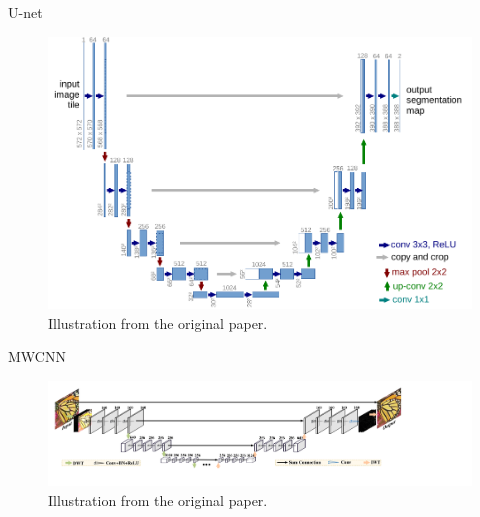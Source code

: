 \begin{frame}{U-net}
    \begin{figure}
        \centering
        \includegraphics[height=0.6\textheight]{Figures/add_slides/unet_hires.pdf}
        \caption{Illustration from the original paper.}
    \end{figure}
\end{frame}

\begin{frame}{MWCNN}
    \begin{figure}
        \centering
        \includegraphics[width=\textwidth]{Figures/add_slides/mwcnn.pdf}
        \caption{Illustration from the original paper.}
    \end{figure}
\end{frame}

